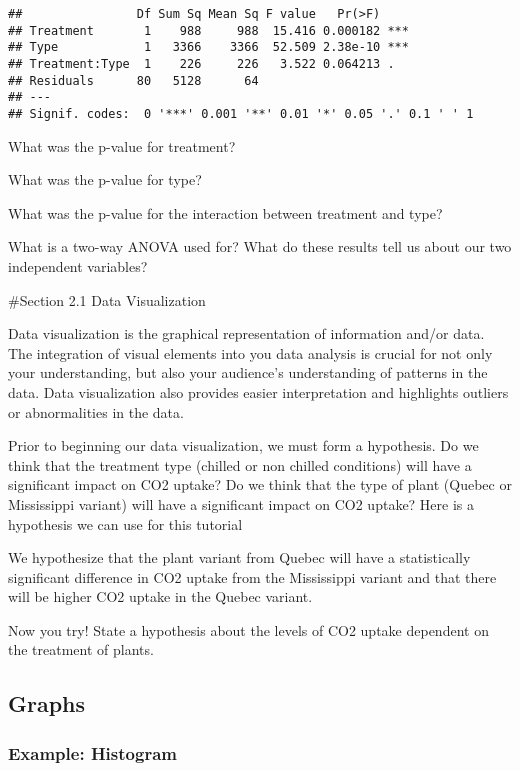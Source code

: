 \documentclass[
]{article}
\begin{document}
\begin{verbatim}
##                Df Sum Sq Mean Sq F value   Pr(>F)    
## Treatment       1    988     988  15.416 0.000182 ***
## Type            1   3366    3366  52.509 2.38e-10 ***
## Treatment:Type  1    226     226   3.522 0.064213 .  
## Residuals      80   5128      64                     
## ---
## Signif. codes:  0 '***' 0.001 '**' 0.01 '*' 0.05 '.' 0.1 ' ' 1
\end{verbatim}

What was the p-value for treatment?

What was the p-value for type?

What was the p-value for the interaction between treatment and type?

What is a two-way ANOVA used for? What do these results tell us about
our two independent variables?

\#Section 2.1 Data Visualization

Data visualization is the graphical representation of information and/or
data. The integration of visual elements into you data analysis is
crucial for not only your understanding, but also your audience's
understanding of patterns in the data. Data visualization also provides
easier interpretation and highlights outliers or abnormalities in the
data.

Prior to beginning our data visualization, we must form a hypothesis. Do
we think that the treatment type (chilled or non chilled conditions)
will have a significant impact on CO2 uptake? Do we think that the type
of plant (Quebec or Mississippi variant) will have a significant impact
on CO2 uptake? Here is a hypothesis we can use for this tutorial

We hypothesize that the plant variant from Quebec will have a
statistically significant difference in CO2 uptake from the Mississippi
variant and that there will be higher CO2 uptake in the Quebec variant.

Now you try! State a hypothesis about the levels of CO2 uptake dependent
on the treatment of plants.

\subsection{Graphs}\label{graphs}

\subsubsection{Example: Histogram}\label{example-histogram}
\end{document}
